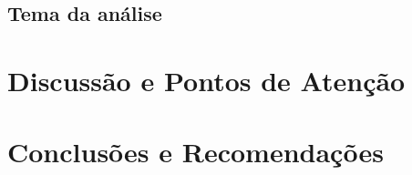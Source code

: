 \documentclass[11pt,a4paper]{article}
\newcommand{\fonte}[1]{\par\vspace{2pt}{\footnotesize\textbf{Fonte:} #1}\par}
\begin{document}
\subsection{Tema da análise}\label{sec:tema1}

\section{Discussão e Pontos de Atenção}\label{sec:discussao}

\section{Conclusões e Recomendações}\label{sec:conclusoes}


\newpage


\end{document}
